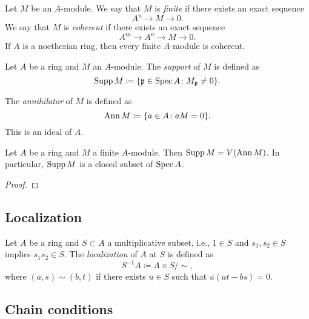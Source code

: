     Let \(M\) be an \(A\)-module.
    We say that \(M\) is \emph{finite} if there exists an exact sequence
    \[ A^n \to M \to 0. \]
    We say that \(M\) is \emph{coherent} if there exists an exact sequence
    \[ A^m \to A^n \to M \to 0. \]
    If \(A\) is a noetherian ring, then every finite \(A\)-module is coherent.

    \begin{definition}\label{def: support of a module}
        Let \(A\) be a ring and \(M\) an \(A\)-module.
        The \emph{support} of \(M\) is defined as
        \[
            \operatorname{Supp} M \coloneqq \{ {\mathfrak{p}} \in \operatorname{Spec} A \colon M_{\mathfrak{p}} \neq 0\}.
        \]
    \end{definition}

    The \emph{annihilator} of \(M\) is defined as
    \[ \operatorname{Ann} M \coloneqq \{ a \in A \colon aM = 0\}. \]
    This is an ideal of \(A\).

    \begin{proposition}\label{prop: support of a finite module}
        Let \(A\) be a ring and \(M\) a finite \(A\)-module.
        Then \(\operatorname{Supp} M = V(\operatorname{Ann} M)\).
        In particular, \(\operatorname{Supp} M\) is a closed subset of \(\operatorname{Spec} A\).
    \end{proposition}
    \begin{proof}
    \end{proof}

\subsection{Localization}

    \begin{definition}\label{def: localization}
        Let \(A\) be a ring and \(S \subset A\) a multiplicative subset, i.e., \(1 \in S\) and \(s_1,s_2 \in S\) implies \(s_1 s_2 \in S\).
        The \emph{localization} of \(A\) at \(S\) is defined as
        \[ S^{-1}A \coloneqq A \times S / \sim, \]
        where \((a,s) \sim (b,t)\) if there exists \(u \in S\) such that \(u(at - bs) = 0\).
    \end{definition}

    \begin{proposition}\label{prop: when is localization injective}
        
    \end{proposition}

\subsection{Chain conditions}




